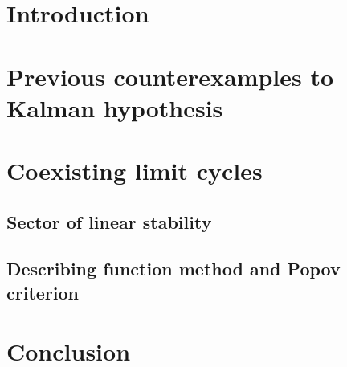 \documentclass{ifacconf}
\theoremstyle{plain}
\begin{document}
\section{Introduction}
\section{Previous counterexamples to Kalman hypothesis}
\section{Coexisting limit cycles}
\quad \subsection{Sector of linear stability}
\quad %
\quad \subsection{Describing function method and Popov criterion}
\section{Conclusion}
\end{document}
